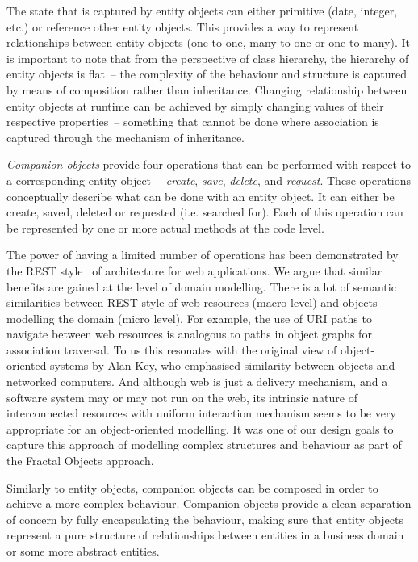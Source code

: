 \documentclass[a4paper,12pt,oneside,openright,final]{memoir} %
\begin{document}
  The state that is captured by entity objects can either primitive (date, integer, etc.) or reference other entity objects.
  This provides a way to represent relationships between entity objects (one-to-one, many-to-one or one-to-many).
  It is important to note that from the perspective of class hierarchy, the hierarchy of entity objects is flat~-- the complexity of the behaviour and structure is captured by means of composition rather than inheritance.  
  Changing relationship between entity objects at runtime can be achieved by simply changing values of their respective properties~-- something that cannot be done where association is captured through the mechanism of inheritance.
  
  \emph{Companion objects} provide four operations that can be performed with respect to a corresponding entity object~--  \emph{create}, \emph{save}, \emph{delete}, and \emph{request}.
  These operations conceptually describe what can be done with an entity object.
  It can either be create, saved, deleted or requested (i.e. searched for).
  Each of this operation can be represented by one or more actual methods at the code level.
    
  The power of having a limited number of operations has been demonstrated by the REST style~\cite{Fielding2000} of architecture for web applications.
  We argue that similar benefits are gained at the level of domain modelling.
  There is a lot of semantic similarities between REST style of web resources (macro level) and objects modelling the domain (micro level).
  For example, the use of URI paths to navigate between web resources is analogous to paths in object graphs for association traversal.
  To us this resonates with the original view of object-oriented systems by Alan Key, who emphasised similarity between objects and networked computers.
  And although web is just a delivery mechanism, and a software system may or may not run on the web, its intrinsic nature of interconnected resources with uniform interaction mechanism seems to be very appropriate for an object-oriented modelling.
  It was one of our design goals to capture this approach of modelling complex structures and behaviour as part of the Fractal Objects approach.

  Similarly to entity objects, companion objects can be composed in order to achieve a more complex behaviour.
  Companion objects provide a clean separation of concern by fully encapsulating the behaviour, making sure that entity objects represent a pure structure of relationships between entities in a business domain or some more abstract entities.
  
\end{document}
